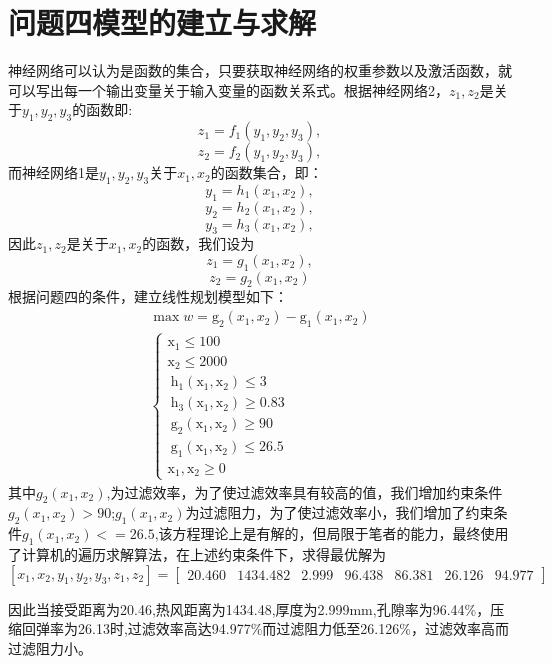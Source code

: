 \documentclass[withoutpreface,bwprint]{cumcmthesis} %
\begin{document}
\section{问题四模型的建立与求解}	
神经网络可以认为是函数的集合，只要获取神经网络的权重参数以及激活函数，就可以写出每一个输出变量关于输入变量的函数关系式。根据神经网络2，$z_1,z_2$是关于$y_1,y_2,y_3$的函数即:
$$z_1=f_1(y_1,y_2,y_3),$$
$$z_2=f_2(y_1,y_2,y_3),$$
而神经网络1是$y_1,y_2,y_3$关于$x_1,x_2$的函数集合，即：
$$y_1=h_1(x_1,x_2),$$
$$y_2=h_2(x_1,x_2),$$
$$y_3=h_3(x_1,x_2),$$
因此$z_1,z_2$是关于$x_1,x_2$的函数，我们设为
$$z_1=g_1(x_1,x_2),$$
$$z_2=g_2(x_1,x_2)$$
根据问题四的条件，建立线性规划模型如下：
$$\begin{array}{c}
\max  w=\mathrm{g}_{2}\left(x_{1}, x_{2}\right)-\mathrm{g}_{1}\left(x_{1}, x_{2}\right) \\
\left\{\begin{array}{c}
\mathrm{x}_{1} \leq 100 \\
\mathrm{x}_{2} \leq 2000 \\
\mathrm{~h}_{1}\left(\mathrm{x}_{1}, \mathrm{x}_{2}\right) \leq 3 \\
\mathrm{~h}_{3}\left(\mathrm{x}_{1}, \mathrm{x}_{2}\right) \geq 0.83 \\
\mathrm{~g}_{2}\left(\mathrm{x}_{1}, \mathrm{x}_{2}\right) \geq 90 \\
\mathrm{~g}_{1}\left(\mathrm{x}_{1}, \mathrm{x}_{2}\right) \leq 26.5 \\
\mathrm{x}_{1}, \mathrm{x}_{2} \geq 0
\end{array}\right.
\end{array}$$
其中$g_2(x_1,x_2)$,为过滤效率，为了使过滤效率具有较高的值，我们增加约束条件$g_2(x_1,x_2)>90$;$g_1(x_1,x_2)$为过滤阻力，为了使过滤效率小，我们增加了约束条件$g_1(x_1,x_2)<=26.5$,该方程理论上是有解的，但局限于笔者的能力，最终使用了计算机的遍历求解算法，在上述约束条件下，求得最优解为
$$[x_1,x_2,y_1,y_2,y_3,z_1,z_2]=\left[\begin{array}{lllllll}
20.460 & 1434.482 & 2.999 & 96.438 & 86.381 & 26.126 & 94.977
\end{array}\right]
$$

因此当接受距离为20.46,热风距离为1434.48,厚度为2.999mm,孔隙率为96.44\%，压缩回弹率为26.13时,过滤效率高达94.977\%而过滤阻力低至26.126\%，过滤效率高而过滤阻力小。

	
	
	
	
	
	
	
	
	
		
\end{document}
